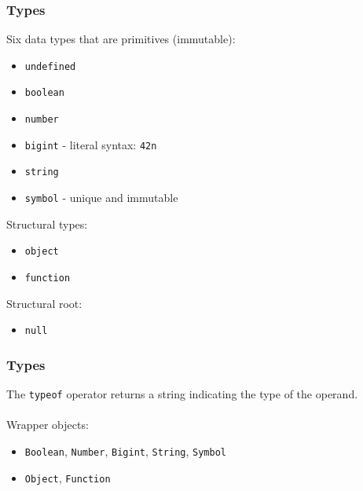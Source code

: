 \begin{frame}[fragile]
  \frametitle{Types}
Six data types that are primitives (immutable):
\begin{itemize}
  \item  \verb|undefined|
  \item  \verb|boolean|
  \item  \verb|number|
  \item  \verb|bigint| - literal syntax: \verb|42n|
  \item  \verb|string|
  \item  \verb|symbol| - unique and immutable
\end{itemize}
Structural types:
\begin{itemize}
  \item  \verb|object|
  \item  \verb|function|
\end{itemize}
Structural root:
\begin{itemize}
  \item  \verb|null|
\end{itemize}
\end{frame}

\begin{frame}[fragile]
  \frametitle{Types}
The \verb|typeof| operator returns a string indicating the type of the operand.
\\ \vspace{5 mm}
\\ \vspace{5 mm}
Wrapper objects:
\begin{itemize}
  \item  \verb|Boolean|, \verb|Number|, \verb|Bigint|, \verb|String|, \verb|Symbol|
  \item  \verb|Object|, \verb|Function|
\end{itemize}
\vspace{5 mm}
\end{frame}

